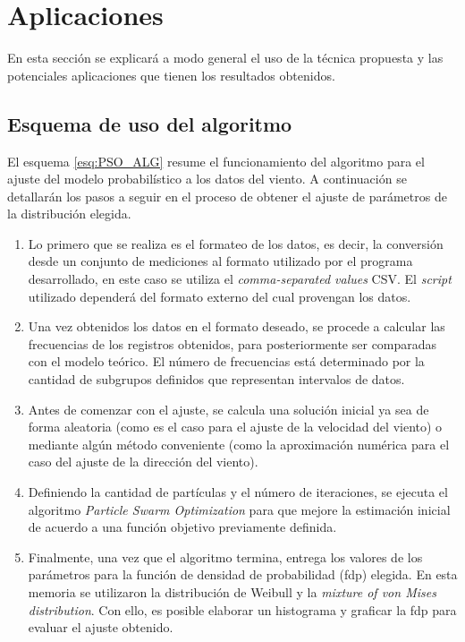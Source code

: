 
\chapter{Aplicaciones}
En esta sección se explicará a modo general el uso de la técnica propuesta y las potenciales aplicaciones que tienen los resultados obtenidos.
\section{Esquema de uso del algoritmo}
El esquema \ref{esq:PSO_ALG} resume el funcionamiento del algoritmo para el ajuste del modelo probabilístico a los datos del viento. A continuación se detallarán los pasos a seguir en el proceso de obtener el ajuste de parámetros de la distribución elegida.
\begin{enumerate}
    \item Lo primero que se realiza es el formateo de los datos, es decir, la conversión desde un conjunto de mediciones al formato utilizado por el programa desarrollado, en este caso se utiliza el \emph{comma-separated values} CSV. El \emph{script} utilizado dependerá del formato externo del cual provengan los datos.
    \item Una vez obtenidos los datos en el formato deseado, se procede a calcular las frecuencias de los registros obtenidos, para posteriormente ser comparadas con el modelo teórico. El número de frecuencias está determinado por la cantidad de subgrupos definidos que representan intervalos de datos.
    \item Antes de comenzar con el ajuste, se calcula una solución inicial ya sea de forma aleatoria (como es el caso para el ajuste de la velocidad del viento) o mediante algún método conveniente (como la aproximación numérica para el caso del ajuste de la dirección del viento).  
    \item Definiendo la cantidad de partículas y el número de iteraciones, se ejecuta el algoritmo \emph{Particle Swarm Optimization} para que mejore la estimación inicial de acuerdo a una función objetivo previamente definida. 
    \item Finalmente, una vez que el algoritmo termina, entrega los valores de los parámetros para la función de densidad de probabilidad (fdp) elegida. En esta memoria se utilizaron la distribución de Weibull y la \emph{mixture of von Mises distribution}. Con ello, es posible elaborar un histograma y graficar la fdp para evaluar el ajuste obtenido.
\end{enumerate}
